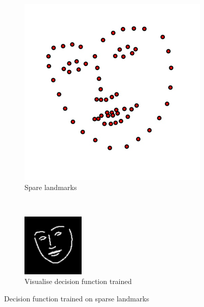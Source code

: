 \begin{figure}[h!]
    \centering
    \begin{subfigure}[b]{0.15\textwidth}
            \includegraphics[width=\textwidth]{resources/landmark}
        \caption{Spare landmarks}
    \end{subfigure}
    ~~~~~~~~~
    \begin{subfigure}[b]{0.15\textwidth}
            \includegraphics[width=\textwidth]{resources/svs}
        \caption{Visualise decision function trained}
        \label{fig:svs}
    \end{subfigure}
    \caption{Decision function trained on sparse landmarks}
    \label{fig:build_svs}
\end{figure}



